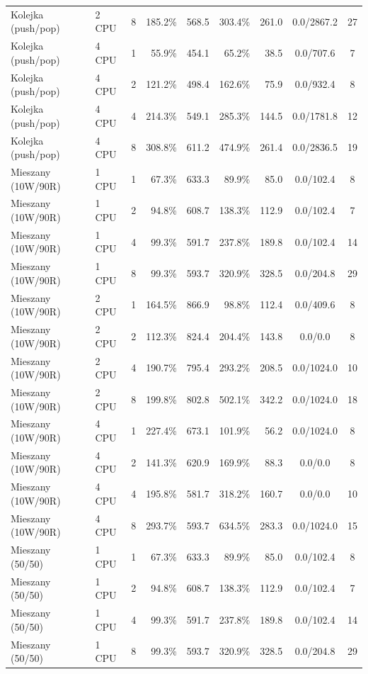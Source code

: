 \begin{table}[ht]
{\begin{tabular}{llcrrrrcc}
Kolejka (push/pop) & 2 CPU & 8 & 185.2\% & 568.5 & 303.4\% & 261.0 & 0.0/2867.2 & 27 \\
Kolejka (push/pop) & 4 CPU & 1 & 55.9\% & 454.1 & 65.2\% & 38.5 & 0.0/707.6 & 7 \\
Kolejka (push/pop) & 4 CPU & 2 & 121.2\% & 498.4 & 162.6\% & 75.9 & 0.0/932.4 & 8 \\
Kolejka (push/pop) & 4 CPU & 4 & 214.3\% & 549.1 & 285.3\% & 144.5 & 0.0/1781.8 & 12 \\
Kolejka (push/pop) & 4 CPU & 8 & 308.8\% & 611.2 & 474.9\% & 261.4 & 0.0/2836.5 & 19 \\
Mieszany (10W/90R) & 1 CPU & 1 & 67.3\% & 633.3 & 89.9\% & 85.0 & 0.0/102.4 & 8 \\
Mieszany (10W/90R) & 1 CPU & 2 & 94.8\% & 608.7 & 138.3\% & 112.9 & 0.0/102.4 & 7 \\
Mieszany (10W/90R) & 1 CPU & 4 & 99.3\% & 591.7 & 237.8\% & 189.8 & 0.0/102.4 & 14 \\
Mieszany (10W/90R) & 1 CPU & 8 & 99.3\% & 593.7 & 320.9\% & 328.5 & 0.0/204.8 & 29 \\
Mieszany (10W/90R) & 2 CPU & 1 & 164.5\% & 866.9 & 98.8\% & 112.4 & 0.0/409.6 & 8 \\
Mieszany (10W/90R) & 2 CPU & 2 & 112.3\% & 824.4 & 204.4\% & 143.8 & 0.0/0.0 & 8 \\
Mieszany (10W/90R) & 2 CPU & 4 & 190.7\% & 795.4 & 293.2\% & 208.5 & 0.0/1024.0 & 10 \\
Mieszany (10W/90R) & 2 CPU & 8 & 199.8\% & 802.8 & 502.1\% & 342.2 & 0.0/1024.0 & 18 \\
Mieszany (10W/90R) & 4 CPU & 1 & 227.4\% & 673.1 & 101.9\% & 56.2 & 0.0/1024.0 & 8 \\
Mieszany (10W/90R) & 4 CPU & 2 & 141.3\% & 620.9 & 169.9\% & 88.3 & 0.0/0.0 & 8 \\
Mieszany (10W/90R) & 4 CPU & 4 & 195.8\% & 581.7 & 318.2\% & 160.7 & 0.0/0.0 & 10 \\
Mieszany (10W/90R) & 4 CPU & 8 & 293.7\% & 593.7 & 634.5\% & 283.3 & 0.0/1024.0 & 15 \\
Mieszany (50/50) & 1 CPU & 1 & 67.3\% & 633.3 & 89.9\% & 85.0 & 0.0/102.4 & 8 \\
Mieszany (50/50) & 1 CPU & 2 & 94.8\% & 608.7 & 138.3\% & 112.9 & 0.0/102.4 & 7 \\
Mieszany (50/50) & 1 CPU & 4 & 99.3\% & 591.7 & 237.8\% & 189.8 & 0.0/102.4 & 14 \\
Mieszany (50/50) & 1 CPU & 8 & 99.3\% & 593.7 & 320.9\% & 328.5 & 0.0/204.8 & 29 \\

\end{tabular}}
\end{table}
